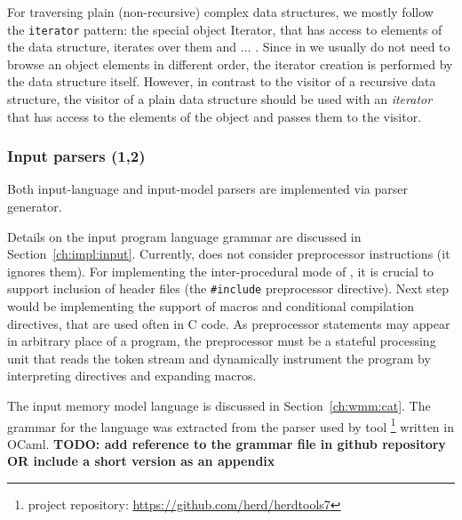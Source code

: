 For traversing plain (non-recursive) complex data structures, we mostly follow the \texttt{iterator} pattern: the special object Iterator, that has access to elements of the data structure, iterates over them and ...
. Since in \porthos[] we usually do not need to browse an object elements in different order, the iterator creation is performed by the data structure itself.
However, in contrast to the visitor of a recursive data structure, the visitor of a plain data structure should be used with an \textit{iterator} that has access to the elements of the object and passes them to the visitor.




\subsubsection{Input parsers (1,2)}
\label{ch:impl:proc:input-parser}

Both input-language and input-model parsers are implemented via  parser generator.

Details on the input program language grammar are discussed in Section~\ref{ch:impl:input}.
Currently, \porthos[2] does not consider preprocessor instructions (it ignores them).
For implementing the inter-procedural mode of \porthos{}, it is crucial to support inclusion of header files (the \texttt{\#include} preprocessor directive).
Next step would be implementing the support of macros and conditional compilation directives, that are used often in C code.
As preprocessor statements may appear in arbitrary place of a program, the preprocessor must be a stateful processing unit that reads the token stream and dynamically instrument the program by interpreting directives and expanding macros.

The input memory model language \cat{} is discussed in Section~\ref{ch:wmm:cat}.
The  grammar for the \cat{} language was extracted from the parser used by  tool%
\footnote{ project repository: \url{https://github.com/herd/herdtools7}} %
written in OCaml.
\textbf{TODO: add reference to the grammar file in github repository OR include a short version as an appendix}

